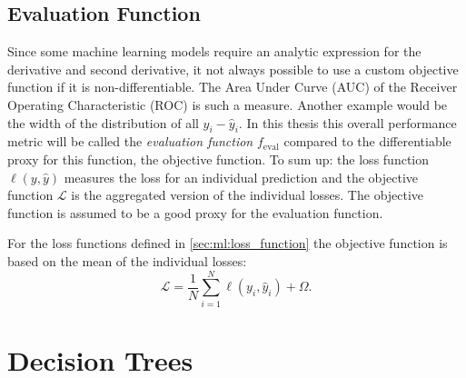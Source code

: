 \documentclass[a4paper, twoside, nobib]{tufte-book}
\begin{document}
\subsection{Evaluation Function}
Since some machine learning models require an analytic expression for the derivative and second derivative, it not always possible to use a custom objective function if it is non-differentiable. The Area Under Curve (AUC) of the Receiver Operating Characteristic (ROC) is such a measure. Another example would be the width of the distribution of all $y_i-\hat{y}_i$. In this thesis this overall performance metric will be called the \emph{evaluation function} $f_\mathrm{eval}$ compared to the differentiable proxy for this function, the objective function. To sum up: the loss function $\ell(y, \hat{y})$ measures the loss for an individual prediction and the objective function $\mathcal{L}$ is the aggregated version of the individual losses. The objective function is assumed to be a good proxy for the evaluation function. 

For the loss functions defined in \autoref{sec:ml:loss_function} the objective function is based on the mean of the individual losses:
\begin{equation}
  \mathcal{L} = \frac{1}{N} \sum_{i=1}^N \ell(y_i, \hat{y}_i) + \Omega. 
\end{equation}

\section{Decision Trees}
\label{sec:ml:decision_trees}
\end{document}
